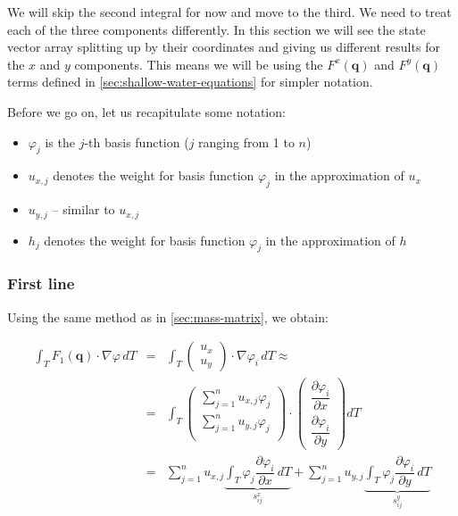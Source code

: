 \documentclass{article}
\newcommand{\pd}[2]{\dfrac{\partial #1}{\partial #2}}
\renewcommand{\phi}{\varphi}
\begin{document}
We will skip the second integral for now and move to the third. We need to treat each of the three components differently. In this section we will see the state vector array splitting up by their coordinates and giving us different results for the $x$ and $y$ components. This means we will be using the $F^x\left(\mathbf{q}\right)$ and $F^y\left(\mathbf{q}\right)$ terms defined in \ref{sec:shallow-water-equations} for simpler notation.

Before we go on, let us recapitulate some notation:
\begin{itemize}
\item $\phi_j$ is the $j$-th basis function ($j$ ranging from 1 to $n$)
\item $u_{x,j}$ denotes the weight for basis function $\phi_j$ in the approximation of $u_x$
\item $u_{y,j}$ -- similar to $u_{x,j}$
\item $h_j$ denotes the weight for basis function $\phi_j$ in the approximation of $h$
\end{itemize}

\subsubsection{First line}
\label{sec:stiffness-matrix-first-line}

Using the same method as in \ref{sec:mass-matrix}, we obtain:

\begin{eqnarray*}
  \int_T F_1(\mathbf{q}) \cdot \nabla \phi \, dT & = &
  \int_T
  \begin{pmatrix}
    u_x \\ u_y
  \end{pmatrix}
  \cdot \nabla \phi_i \, dT \approx \\
  &=& \int_T
  \begin{pmatrix}
    \sum_{j=1}^n u_{x,j} \phi_j \\
    \sum_{j=1}^n u_{y,j} \phi_j \\
  \end{pmatrix}
  \cdot
  \begin{pmatrix}
    \pd{\phi_i}{x} \\
    \pd{\phi_i}{y}
  \end{pmatrix} dT \\
  & = & \sum_{j=1}^n u_{x,j} \underbrace{\int_T \phi_j \pd{\phi_i}{x} \, dT}_{s_{ij}^x} + \sum_{j=1}^n u_{y,j} \underbrace{\int_T \phi_j \pd{\phi_i}{y} \, dT}_{s_{ij}^y}
\end{eqnarray*}
\end{document}

